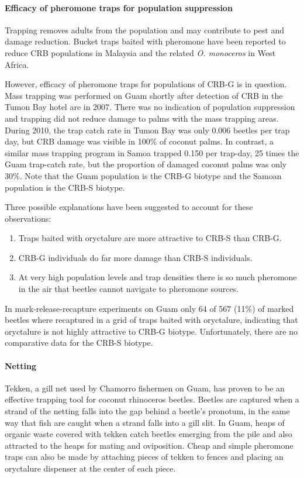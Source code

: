\documentclass[twocolumn,letterpaper]{scrartcl}
\begin{document}
\paragraph{Efficacy of pheromone traps for population suppression} Trapping removes adults from the population and may contribute to pest and damage reduction. Bucket traps baited with pheromone have been reported to reduce CRB populations in Malaysia and the related \textit{O. monoceros} in West Africa. 

However, efficacy of pheromone traps for populations of CRB-G is in question.
Mass trapping was performed on Guam shortly after detection of CRB in the Tumon Bay hotel are in 2007. There was no indication of population suppression and trapping did not reduce damage to palms with the mass trapping areas. During 2010, the trap catch rate in Tumon Bay was only 0.006 beetles per trap day, but CRB damage was visible in 100\% of coconut palms. In contrast, a similar mass trapping program in Samoa trapped 0.150 per trap-day, 25 times the Guam trap-catch rate, but the proportion of damaged coconut palms was only 30\%. Note that the Guam population is the CRB-G biotype and the Samoan population is the CRB-S biotype. 

Three possible explanations have been suggested to account for these observations:
\begin{enumerate}
\item Traps baited with oryctalure are more attractive to CRB-S than CRB-G.
\item CRB-G individuals do far more damage than CRB-S individuals.
\item At very high population levels and trap densities there is so much pheromone in the air that beetles cannot navigate to pheromone sources.
\end{enumerate}

In mark-release-recapture experiments on Guam only 64 of 567 (11\%) of marked beetles where recaptured in a grid of traps baited with oryctalure, indicating that oryctalure is not highly attractive to CRB-G biotype. Unfortunately, there are no comparative data for the CRB-S biotype.  

\paragraph{Netting} Tekken, a gill net used by Chamorro fishermen on Guam, has proven to be an effective trapping tool for coconut rhinoceros beetles. Beetles are captured when a strand of the netting falls into the gap behind a beetle's pronotum, in the same way that fish are caught when a strand falls into a gill slit. In Guam, heaps of organic waste covered with tekken catch beetles emerging from the pile and also attracted to the heaps for mating and oviposition. Cheap and simple pheromone traps can also be made by attaching pieces of tekken to fences and placing an oryctalure dispenser at the center of each piece. 
\end{document}
